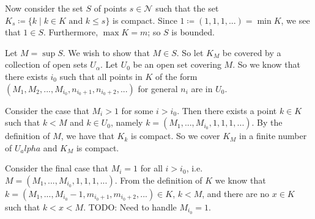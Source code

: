 Now consider the set \(S\) of points \(s \in \mathcal N\) such that the set
\(K_s \coloneqq \{k \mid k \in K \text{ and } k \leq s\}\) is compact. Since
\(1 \coloneqq (1, 1, 1, ...) = \min K\), we see that \(1 \in S\). Furthermore, \(\max K = m\); so \(S\) is
bounded.

Let \(M = \sup S\). We wish to show that \(M \in S\). So let \(K_M\) be covered by a collection of open sets
\(U_\alpha\). Let \(U_0\) be an open set covering \(M\). So we know that there exists \(i_0\) such that all
points in \(K\) of the form \((M_1, M_2, ..., M_{i_0}, n_{i_0+1}, n_{i_0 + 2}, ...)\) for
general \(n_i\) are in \(U_0\).  

Consider the case that \(M_i > 1\) for some \(i > i_0\). Then there exists a point \(k \in K\) such that
\(k < M\) and \(k \in U_0\), namely \(k = (M_1, ..., M_{i_0}, 1, 1, 1, ...)\). By the definition of \(M\), we
have that \(K_k\) is compact. So we cover \(K_M\) in a finite number of \(U_alpha\) and \(K_M\) is compact.

Consider the final case that \(M_i = 1\) for all \(i > i_0\), i.e. \(M = (M_1, ..., M_{i_0}, 1, 1, 1, ...)\).
From the definition of \(K\) we know that \(k = (M_1, ..., M_{i_0} - 1, m_{i_0 + 1}, m_{i_0 + 2}, ...) \in K\),
\(k < M\), and there are no \(x \in K\) such that \(k < x < M\). TODO: Need to handle \(M_{i_0} = 1\).
